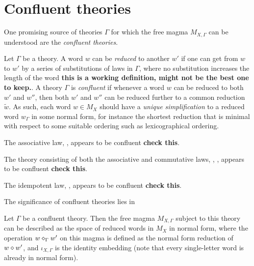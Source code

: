 \section{Confluent theories}

One promising source of theories $\Gamma$ for which the free magma $M_{X,\Gamma}$ can be understood are the \emph{confluent theories}.

\begin{definition}\label{confluent-theory}
  Let $\Gamma$ be a theory.  A word $w$ can be \emph{reduced} to another $w'$ if one can get from $w$ to $w'$ by a series of substitutions of laws in $\Gamma$, where no substitution increases the length of the word {\bf this is a working definition, might not be the best one to keep.}.  A theory $\Gamma$ is \emph{confluent} if whenever a word $w$ can be reduced to both $w'$ and $w''$, then both $w'$ and $w''$ can be reduced further to a common reduction $\tilde w$.  As such, each word $w \in M_X$ should have a \emph{unique simplification} to a reduced word $w_\Gamma$ in some normal form, for instance the shortest reduction that is minimal with respect to some suitable ordering such as lexicographical ordering.
\end{definition}

\begin{example}
  The associative law, , appears to be confluent {\bf check this}.
\end{example}

\begin{example}
  The theory consisting of both the associative and commutative laws, , , appears to be confluent {\bf check this}.
\end{example}

\begin{example}
  The idempotent law, , appears to be confluent {\bf check this}.
\end{example}

The significance of confluent theories lies in

\begin{theorem}\label{free-confluent}
  Let $\Gamma$ be a confluent theory.  Then the free magma $M_{X,\Gamma}$ subject to this theory can be described as the space of reduced words in $M_X$ in normal form, where the operation $w \diamond_\Gamma w'$ on this magma is defined as the normal form reduction of $w \diamond w'$, and $\iota_{X,\Gamma}$ is the identity embedding (note that every single-letter word is already in normal form).
\end{theorem}

